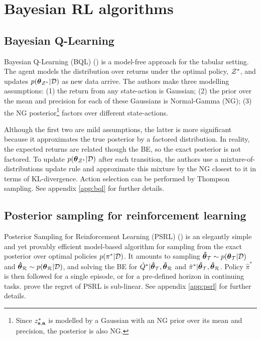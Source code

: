\documentclass{article}
\begin{document}
\section{Bayesian RL algorithms}
\subsection{Bayesian Q-Learning}
Bayesian Q-Learning (BQL) (\cite{bqlearning}) is a model-free approach for the tabular setting. The agent models the distribution over returns under the optimal policy, $\mathcal{Z}^*$, and updates $p(\boldsymbol{\theta}_{\mathcal{Z}^*} | \mathcal{D})$ as new data arrive. The authors make three modelling assumptions: (1) the return from any state-action is Gaussian; (2) the prior over the mean and precision for each of these Gaussians is Normal-Gamma (NG); (3) the NG posterior\footnote{Since $z^*_{\mathbf{s}, \mathbf{a}}$ is modelled by a Gaussian with an NG prior over its mean and precision, the posterior is also NG.} factors over different state-actions.

Although the first two are mild assumptions, the latter is more significant because it approximates the true posterior by a factored distribution. In reality, the expected returns are related though the BE, so the exact posterior is not factored. To update $p(\boldsymbol{\theta}_{\mathcal{Z}^*} | \mathcal{D})$ after each transition, the authors use a mixture-of-distributions update rule and approximate this mixture by the NG closest to it in terms of KL-divergence. Action selection can be performed by Thompson sampling. See appendix \ref{app:bql} for further details.

\subsection{Posterior sampling for reinforcement learning}

Posterior Sampling for Reinforcement Learning (PSRL) (\cite{psrl}) is an elegantly simple and yet provably efficient model-based algorithm for sampling from the exact posterior over optimal policies $p(\pi^* | \mathcal{D})$. It amounts to sampling $\boldsymbol{\hat{\theta}}_{\mathcal{T}} \sim p(\boldsymbol{\theta}_{\mathcal{T}} | \mathcal{D})$ and $\boldsymbol{\hat{\theta}}_{\mathcal{R}} \sim p(\boldsymbol{\theta}_{\mathcal{R}} | \mathcal{D})$, and solving the BE for $\hat{Q}^* | \boldsymbol{\hat{\theta}}_{\mathcal{T}}, \boldsymbol{\hat{\theta}}_{\mathcal{R}} $ and $\hat{\pi}^* | \boldsymbol{\hat{\theta}}_{\mathcal{T}}, \boldsymbol{\hat{\theta}}_{\mathcal{R}}$. Policy $\hat{\pi}^*$ is then followed for a single episode, or for a pre-defined horizon in continuing tasks. \cite{psrl} prove the regret of PSRL is sub-linear. See appendix \ref{app:psrl} for further details.
\end{document}
